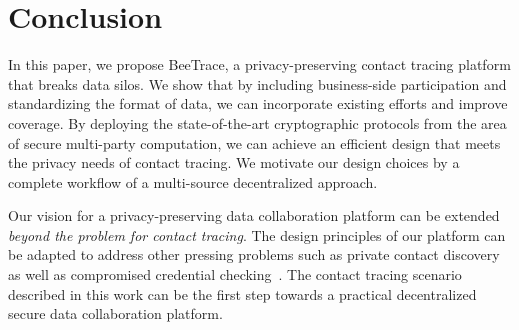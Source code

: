 \documentclass[11pt]{article}  %
\newcommand{\sysname}{\textsf{BeeTrace}\xspace}
\begin{document}

\section{Conclusion}

In this paper, we propose \sysname, a privacy-preserving contact tracing platform that breaks data silos. We show that by including business-side participation and standardizing the format of data, we can incorporate existing efforts and improve coverage. By deploying the state-of-the-art cryptographic protocols from the area of secure multi-party computation, we can achieve an efficient design that meets the privacy needs of contact tracing. We motivate our design choices by a complete workflow of a multi-source decentralized approach. %

Our vision for a privacy-preserving data collaboration platform can be extended \emph{beyond the problem for contact tracing}. 
The design principles of our platform can be adapted to address other pressing problems such as private contact discovery~\cite{Kales2019} as well as compromised credential checking~\cite{Li2019}. 
The contact tracing scenario described in this work can be the first step towards a practical decentralized secure data collaboration platform. 
\end{document}
